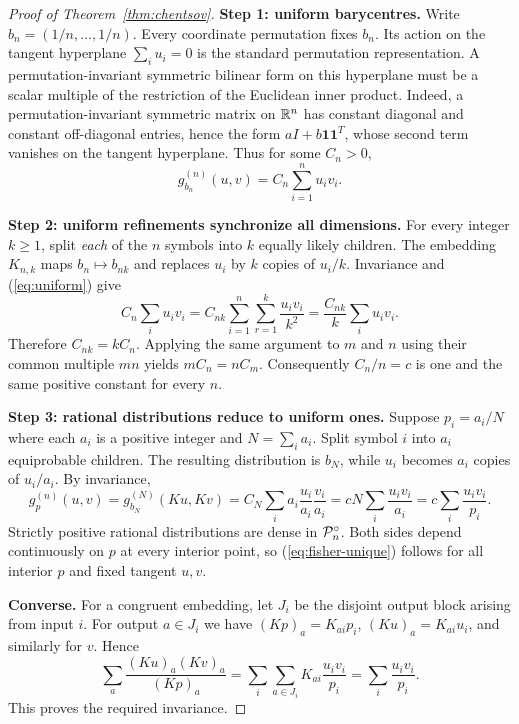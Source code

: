 \documentclass[11pt]{article}
\theoremstyle{definition}\newtheorem{definition}[theorem]{Definition}\newtheorem{exercise}{Problem}[section]
\begin{document}
\begin{proof}[Proof of Theorem~\ref{thm:chentsov}]
\textbf{Step 1: uniform barycentres.} Write $b_n=(1/n,\ldots,1/n)$. Every coordinate permutation fixes $b_n$. Its action on the tangent hyperplane $\sum_i u_i=0$ is the standard permutation representation. A permutation-invariant symmetric bilinear form on this hyperplane must be a scalar multiple of the restriction of the Euclidean inner product. Indeed, a permutation-invariant symmetric matrix on $\mathbb R^n$ has constant diagonal and constant off-diagonal entries, hence the form $aI+b\mathbf{1}\mathbf{1}^{\!T}$, whose second term vanishes on the tangent hyperplane. Thus for some $C_n>0$,
\begin{equation}\label{eq:uniform}
  g^{(n)}_{b_n}(u,v)=C_n\sum_{i=1}^n u_iv_i.
\end{equation}

\textbf{Step 2: uniform refinements synchronize all dimensions.} For every integer $k\ge1$, split \emph{each} of the $n$ symbols into $k$ equally likely children. The embedding $K_{n,k}$ maps $b_n\mapsto b_{nk}$ and replaces $u_i$ by $k$ copies of $u_i/k$. Invariance and (\ref{eq:uniform}) give
\[
 C_n\sum_i u_iv_i=C_{nk}\sum_{i=1}^n\sum_{r=1}^k\frac{u_iv_i}{k^2}
 =\frac{C_{nk}}{k}\sum_i u_iv_i.
\]
Therefore $C_{nk}=kC_n$. Applying the same argument to $m$ and $n$ using their common multiple $mn$ yields $mC_n=nC_m$. Consequently $C_n/n=c$ is one and the same positive constant for every $n$.

\textbf{Step 3: rational distributions reduce to uniform ones.} Suppose $p_i=a_i/N$ where each $a_i$ is a positive integer and $N=\sum_i a_i$. Split symbol $i$ into $a_i$ equiprobable children. The resulting distribution is $b_N$, while $u_i$ becomes $a_i$ copies of $u_i/a_i$. By invariance,
\[
 g^{(n)}_p(u,v)=g^{(N)}_{b_N}(Ku,Kv)
 =C_N\sum_i a_i\frac{u_i}{a_i}\frac{v_i}{a_i}
 =cN\sum_i\frac{u_iv_i}{a_i}=c\sum_i\frac{u_iv_i}{p_i}.
\]
Strictly positive rational distributions are dense in $\mathcal P_n^\circ$. Both sides depend continuously on $p$ at every interior point, so (\ref{eq:fisher-unique}) follows for all interior $p$ and fixed tangent $u,v$.

\textbf{Converse.} For a congruent embedding, let $J_i$ be the disjoint output block arising from input $i$. For output $a\in J_i$ we have $(Kp)_a=K_{ai}p_i$, $(Ku)_a=K_{ai}u_i$, and similarly for $v$. Hence
\[
\sum_{a}\frac{(Ku)_a(Kv)_a}{(Kp)_a}
 =\sum_i\sum_{a\in J_i}K_{ai}\frac{u_iv_i}{p_i}
 =\sum_i\frac{u_iv_i}{p_i}.
\]
This proves the required invariance.\qedhere
\end{proof}
\end{document}
